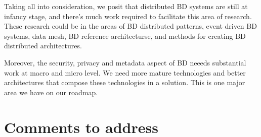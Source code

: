 \documentclass[review]{elsarticle}
\begin{document}
Taking all into consideration, we posit that distributed BD systems are still at infancy stage, and there's much work required to facilitate this area of research. These research could be in the areas of BD distributed patterns, event driven BD systems, data mesh, BD reference architecturse, and methods for creating BD distributed architectures.

Moreover, the security, privacy and metadata aspect of BD neeeds substantial work at macro and micro level. We need more mature technologies and better architectures that compose these technologies in a solution. This is one major area we have on our roadmap.


\section{Comments to address}
\end{document}
